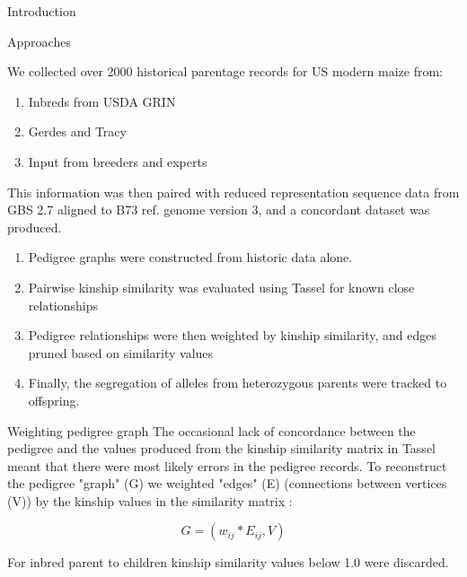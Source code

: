 \documentclass[final]{beamer}
\newlength{\onecolwid}
\begin{document}
\begin{frame}[t]
\begin{columns}[t]
\begin{column}{\onecolwid}
\begin{block}{Introduction}
\end{block}


\begin{block}{Approaches}


We collected over 2000 historical parentage records for US modern maize from: 
\begin{enumerate}
\item Inbreds from USDA GRIN 
\item Gerdes and Tracy \cite{gerdes1993compilation}
\item Input from breeders and experts
\end{enumerate}

\par
This information was then paired with reduced representation sequence data from GBS 2.7 \cite{Glaubitz:2014eu} aligned to B73 ref. genome version 3, and a concordant dataset was produced.
\par

\begin{enumerate}
\item Pedigree graphs were constructed from historic data alone.
\item Pairwise kinship similarity was evaluated using Tassel \cite{Bradbury:2007fd} for known close relationships 
\item Pedigree relationships were then weighted by kinship similarity, and edges pruned based on similarity values
\item Finally, the segregation of alleles from heterozygous parents were tracked to offspring.
\end{enumerate}


\end{block}

\begin{alertblock}{Weighting pedigree graph}
The occasional lack of concordance between the pedigree and the values produced from the kinship similarity matrix in Tassel meant that there were most likely errors in the pedigree records. To reconstruct the pedigree "graph" (G) we weighted "edges" (E) (connections between vertices (V)) by the kinship values in the similarity matrix :
\par
\par
$$G = (w_{ij} * E_{ij}, V)$$
\par
\par
For inbred parent to children kinship similarity values below 1.0 were discarded.


\end{alertblock}
\end{column}
\end{columns}
\end{frame}
\end{document}
